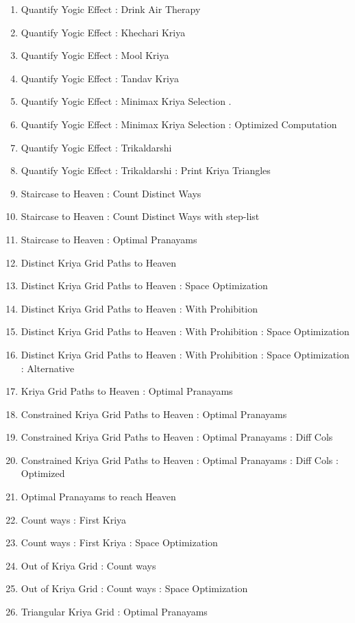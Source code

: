 \begin{enumerate}[noitemsep]
    \item Quantify Yogic Eﬀect : Drink Air Therapy
    \item Quantify Yogic Eﬀect : Khechari Kriya 
    \item Quantify Yogic Eﬀect : Mool Kriya 
    \item Quantify Yogic Eﬀect : Tandav Kriya 
    \item Quantify Yogic Eﬀect : Minimax Kriya Selection .
    \item Quantify Yogic Eﬀect : Minimax Kriya Selection : Optimized Computation 
    \item Quantify Yogic Eﬀect : Trikaldarshi 
    \item Quantify Yogic Eﬀect : Trikaldarshi : Print Kriya Triangles 
    \item Staircase to Heaven : Count Distinct Ways 
    \item Staircase to Heaven : Count Distinct Ways with step-list 
    \item Staircase to Heaven : Optimal Pranayams 
    \item Distinct Kriya Grid Paths to Heaven 
    \item Distinct Kriya Grid Paths to Heaven : Space Optimization 
    \item Distinct Kriya Grid Paths to Heaven : With Prohibition 
    \item Distinct Kriya Grid Paths to Heaven : With Prohibition : Space Optimization
    \item Distinct Kriya Grid Paths to Heaven : With Prohibition : Space Optimization : Alternative
    \item Kriya Grid Paths to Heaven : Optimal Pranayams
    \item Constrained Kriya Grid Paths to Heaven : Optimal Pranayams
    \item Constrained Kriya Grid Paths to Heaven : Optimal Pranayams : Diﬀ Cols
    \item Constrained Kriya Grid Paths to Heaven : Optimal Pranayams : Diﬀ Cols : Optimized 
    \item Optimal Pranayams to reach Heaven 
    \item Count ways : First Kriya 
    \item Count ways : First Kriya : Space Optimization 
    \item Out of Kriya Grid : Count ways 
    \item Out of Kriya Grid : Count ways : Space Optimization 
    \item Triangular Kriya Grid : Optimal Pranayams 

\end{enumerate}
